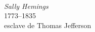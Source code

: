 \begin{center}
  \vspace{1em}

  \begin{minipage}[b]{0.31\textwidth}
    \centering
    \\[0.3em]
    {\small\itshape Sally Hemings}\\
    {\footnotesize 1773--1835 \\ esclave de Thomas Jefferson}
  \end{minipage}

\end{center}
\vspace*{\fill}
